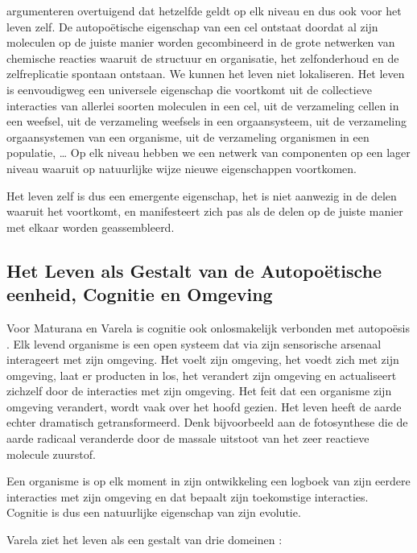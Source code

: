 \documentclass[
  11pt,
]{book}
\begin{document}
\citet{capraLuisi2014} argumenteren overtuigend dat hetzelfde geldt op elk niveau en dus ook voor het leven zelf. De autopoëtische eigenschap van een cel ontstaat doordat al zijn moleculen op de juiste manier worden gecombineerd in de grote netwerken van chemische reacties waaruit de structuur en organisatie, het zelfonderhoud en de zelfreplicatie spontaan ontstaan. We kunnen het leven niet lokaliseren. Het leven is eenvoudigweg een universele eigenschap die voortkomt uit de collectieve interacties van allerlei soorten moleculen in een cel, uit de verzameling cellen in een weefsel, uit de verzameling weefsels in een orgaansysteem, uit de verzameling orgaansystemen van een organisme, uit de verzameling organismen in een populatie, \ldots{} Op elk niveau hebben we een netwerk van componenten op een lager niveau waaruit op natuurlijke wijze nieuwe eigenschappen voortkomen.

Het leven zelf is dus een emergente eigenschap, het is niet aanwezig in de delen waaruit het voortkomt, en manifesteert zich pas als de delen op de juiste manier met elkaar worden geassembleerd.

\hypertarget{het-leven-als-gestalt-van-de-autopouxebtische-eenheid-cognitie-en-omgeving}{%
\subsection{Het Leven als Gestalt van de Autopoëtische eenheid, Cognitie en Omgeving}\label{het-leven-als-gestalt-van-de-autopouxebtische-eenheid-cognitie-en-omgeving}}

Voor Maturana en Varela is cognitie ook onlosmakelijk verbonden met autopoësis \citep{capraLuisi2014}. Elk levend organisme is een open systeem dat via zijn sensorische arsenaal interageert met zijn omgeving. Het voelt zijn omgeving, het voedt zich met zijn omgeving, laat er producten in los, het verandert zijn omgeving en actualiseert zichzelf door de interacties met zijn omgeving. Het feit dat een organisme zijn omgeving verandert, wordt vaak over het hoofd gezien. Het leven heeft de aarde echter dramatisch getransformeerd. Denk bijvoorbeeld aan de fotosynthese die de aarde radicaal veranderde door de massale uitstoot van het zeer reactieve molecule zuurstof.

Een organisme is op elk moment in zijn ontwikkeling een logboek van zijn eerdere interacties met zijn omgeving en dat bepaalt zijn toekomstige interacties. Cognitie is dus een natuurlijke eigenschap van zijn evolutie.

Varela ziet het leven als een gestalt van drie domeinen \citep{capraLuisi2014}:
\end{document}
